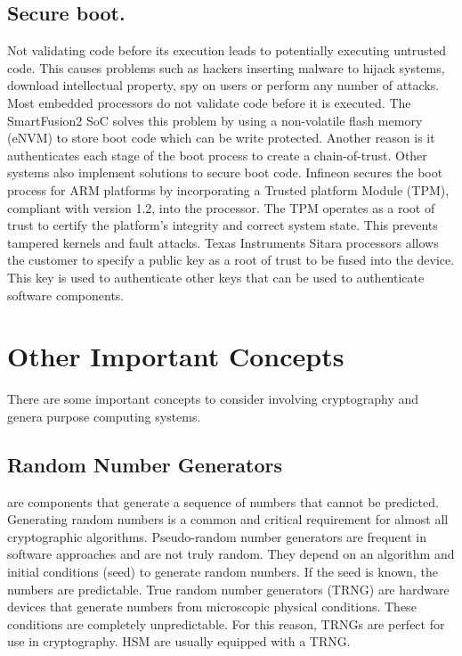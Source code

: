 \subsection*{Secure boot.}
Not validating code before its execution leads to potentially executing untrusted code. This causes problems such as hackers inserting malware to hijack systems, download intellectual property, spy on users or perform any number of attacks.
Most embedded processors do not validate code before it is executed. The SmartFusion2 SoC solves this problem by using a non-volatile flash memory (eNVM) to store boot code which can be write protected. Another reason is it authenticates each stage of the boot process to create a chain-of-trust.
Other systems also implement solutions to secure boot code. Infineon secures the boot process for ARM platforms by incorporating a Trusted platform Module (TPM), compliant with version 1.2, into the processor. The TPM operates as a root of trust to certify the platform's integrity and correct system state. This prevents tampered kernels and fault attacks.
Texas Instruments Sitara processors allows the customer to specify a public key as a root of trust to be fused into the device. This key is used to authenticate other keys that can be used to authenticate software components.

\section{Other Important Concepts} \label{other}

There are some important concepts to consider involving cryptography and genera purpose computing systems.

\subsection{Random Number Generators} are components that generate a sequence of numbers that cannot be predicted. Generating random numbers is a common and critical requirement for almost all cryptographic algorithms. Pseudo-random number generators are frequent in software approaches and are not truly random. They depend on an algorithm and initial conditions (seed) to generate random numbers. If the seed is known, the numbers are predictable.
True random number generators (TRNG) are hardware devices that generate numbers from microscopic physical conditions. These conditions are completely unpredictable. For this reason, TRNGs are perfect for use in cryptography. HSM are usually equipped with a TRNG.

